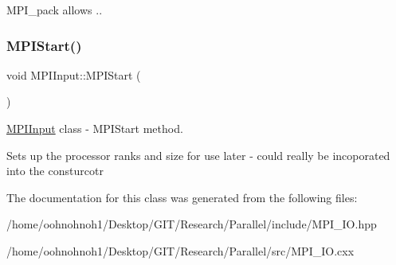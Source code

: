 M\+P\+I\+\_\+pack allows ..\mbox{\label{classMPIInput_a5204b6d3bea6d1d6110b6d180da43e07}} 
\subsubsection{\texorpdfstring{M\+P\+I\+Start()}{MPIStart()}}
{\footnotesize\ttfamily void M\+P\+I\+Input\+::\+M\+P\+I\+Start (\begin{DoxyParamCaption}{ }\end{DoxyParamCaption})}



\hyperlink{classMPIInput}{M\+P\+I\+Input} class -\/ M\+P\+I\+Start method. 

Sets up the processor ranks and size for use later -\/ could really be incoporated into the consturcotr 

The documentation for this class was generated from the following files\+:\begin{DoxyCompactItemize}
\item 
/home/oohnohnoh1/\+Desktop/\+G\+I\+T/\+Research/\+Parallel/include/M\+P\+I\+\_\+\+I\+O.\+hpp\item 
/home/oohnohnoh1/\+Desktop/\+G\+I\+T/\+Research/\+Parallel/src/M\+P\+I\+\_\+\+I\+O.\+cxx\end{DoxyCompactItemize}
